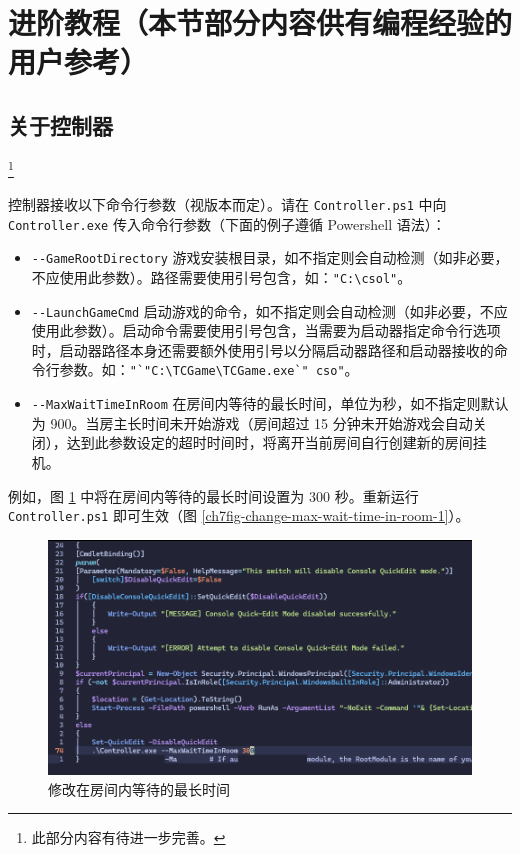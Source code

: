 \section{进阶教程（本节部分内容供有编程经验的用户参考）}
\label{section_advanced_usage}

\subsection{关于控制器}\footnote{此部分内容有待进一步完善。}

控制器接收以下命令行参数（视版本而定）。请在 \lstinline{Controller.ps1} 中向 \lstinline{Controller.exe} 传入命令行参数（下面的例子遵循 Powershell 语法）：

\begin{itemize}
\item \lstinline{--GameRootDirectory} 游戏安装根目录，如不指定则会自动检测（如非必要，不应使用此参数）。路径需要使用引号包含，如：\lstinline{"C:\csol"}。
\item \lstinline{--LaunchGameCmd} 启动游戏的命令，如不指定则会自动检测（如非必要，不应使用此参数）。启动命令需要使用引号包含，当需要为启动器指定命令行选项时，启动器路径本身还需要额外使用引号以分隔启动器路径和启动器接收的命令行参数。如：\lstinline{"`"C:\TCGame\TCGame.exe`" cso"}。
\item \lstinline{--MaxWaitTimeInRoom} 在房间内等待的最长时间，单位为秒，如不指定则默认为 900。当房主长时间未开始游戏（房间超过 15 分钟未开始游戏会自动关闭），达到此参数设定的超时时间时，将离开当前房间自行创建新的房间挂机。
\end{itemize}

例如，图 \ref{ch7fig-change-max-wait-time-in-room-0} 中将在房间内等待的最长时间设置为 300 秒。重新运行 \lstinline{Controller.ps1} 即可生效（图 \ref{ch7fig-change-max-wait-time-in-room-1}）。

\begin{figure}[H]
    \Centering
    \includegraphics[width=\textwidth]{docs/assets/advanced/change_max_wait_time_in_room_0.png}
    \caption{修改在房间内等待的最长时间}
    \label{ch7fig-change-max-wait-time-in-room-0}
\end{figure}

